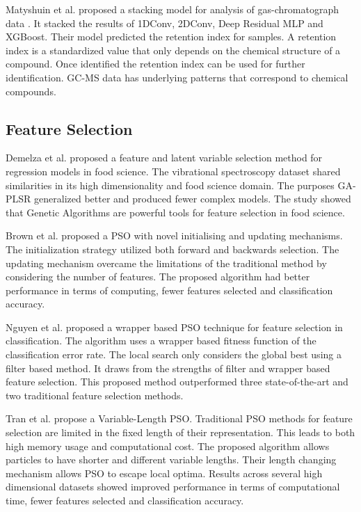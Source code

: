 \documentclass{article}
\begin{document}
Matyshuin et al. proposed a stacking model for analysis of gas-chromatograph data \cite{matyushin2020gas}.
It stacked the results of 1DConv, 2DConv, Deep Residual MLP and XGBoost.
Their model predicted the retention index for samples.
A retention index is a standardized value that only depends on the chemical structure of a compound.
Once identified the retention index can be used for further identification.
GC-MS data has underlying patterns that correspond to chemical compounds.

\subsection{Feature Selection}
\label{sec:related-feature-selection}

Demelza et al. \cite{robinson2020genetic} proposed a feature and latent variable selection method for regression models in food science.
The vibrational spectroscopy dataset shared similarities in its high dimensionality and food science domain.
The purposes GA-PLSR generalized better and produced fewer complex models.
The study showed that Genetic Algorithms are powerful tools for feature selection in food science.

Brown et al. \cite{xue2014particle} proposed a PSO with novel initialising and updating mechanisms.
The initialization strategy utilized both forward and backwards selection.
The updating mechanism overcame the limitations of the traditional method by considering the number of features.
The proposed algorithm had better performance in terms of computing, fewer features selected and classification accuracy.

Nguyen et al. \cite{nguyen2014filter} proposed a wrapper based PSO technique for feature selection in classification.
The algorithm uses a wrapper based fitness function of the classification error rate.
The local search only considers the global best using a filter based method.
It draws from the strengths of filter and wrapper based feature selection.
This proposed method outperformed three state-of-the-art and two traditional feature selection methods.

Tran et al. \cite{tran2018variable} propose a Variable-Length PSO.
Traditional PSO methods for feature selection are limited in the fixed length of their representation.
This leads to both high memory usage and computational cost.
The proposed algorithm allows particles to have shorter and different variable lengths.
Their length changing mechanism allows PSO to escape local optima.
Results across several high dimensional datasets showed improved performance in terms of computational time, fewer features selected and classification accuracy.
\end{document}
